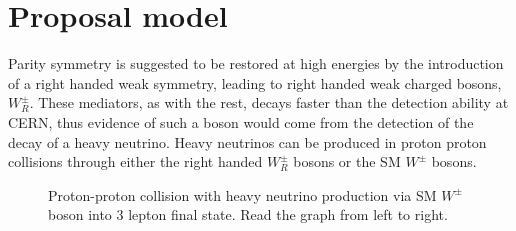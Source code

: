 \section{Proposal model}
Parity symmetry is suggested to be restored at high energies by the introduction of 
a right handed weak symmetry, leading to right handed weak charged bosons, $W_R^{\pm}$. 
These mediators, as with the rest, decays faster than the detection ability at CERN, thus 
evidence of such a boson would come from the detection of the decay of a heavy neutrino. Heavy neutrinos can 
be produced in proton proton collisions through either the right handed $W_R^{\pm}$ bosons or
the SM $W^{\pm}$ bosons. 


\begin{figure}[h!]
    \centering
    \caption{Proton-proton collision with heavy neutrino production via SM $W^{\pm}$ boson into 3 lepton final state. Read the graph from left to right.}
    \label{fig:Target_model_1}
    
\end{figure}



